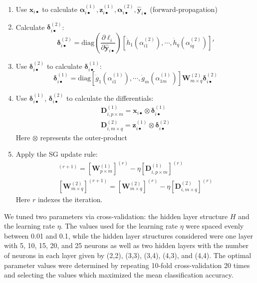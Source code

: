 \documentclass[a4paper]{article}
\newcommand{\diag}{\text{diag}}
\begin{document}
\begin{enumerate}
\item Use $\bm{x}_{i\bullet}$ to calculate $\bm{\alpha}_{i\bullet}^{(1)}, \bm{z}_{i\bullet}^{(1)}, \bm{\alpha}_{i\bullet}^{(2)}, \bm{\hat{y}}_{i\bullet}$ (forward-propagation)
\item Calculate $\bm{\delta}_{i\bullet}^{(2)}$:
\begin{equation*}
\bm{\delta}_{i\bullet}^{(2)} = \diag\left(\frac{\partial\ell_{i}}{\partial \bm{\hat{y}}_{i\bullet}}\right)[\dot{h}_{1}(\alpha_{i1}^{(2)}),\cdots,\dot{h}_{q}(\alpha_{iq}^{(2)})]'
\end{equation*}
\item Use $\bm{\delta}_{i\bullet}^{(2)}$ to calculate  $\bm{\delta}_{i\bullet}^{(1)}$:
\begin{equation*}
\bm{\delta}_{i\bullet}^{(1)} = \diag[\dot{g}_{1}(\alpha_{i1}^{(1)}),\cdots,\dot{g}_{m}(\alpha_{1m}^{(1)})]\bm{W}_{m\times q}^{(2)}\bm{\delta}_{i\bullet}^{(2)}
\end{equation*}
\item Use $\bm{\delta}_{i\bullet}^{(1)}$, $\bm{\delta}_{i\bullet}^{(2)}$ to calculate the differentials:
\begin{gather*}
\bm{D}_{i,p\times m}^{(1)} = \bm{x}_{i\bullet} \otimes \bm{\delta}_{i\bullet}^{(1)} \\
\bm{D}_{i,m\times q}^{(2)} = \bm{z}_{i\bullet}^{(1)} \otimes \bm{\delta}_{i\bullet}^{(2)}
\end{gather*}
Here $\otimes$ represents the outer-product
\item Apply the SG update rule:
\begin{gather*}
[\bm{W}_{p\times m}^{(1)}]^{(r+1)} = [\bm{W}_{p\times m}^{(1)}]^{(r)}-\eta[\bm{D}_{i,p \times m}^{(1)}]^{(r)} \\
[\bm{W}_{m\times q}^{(2)}]^{(r+1)} = [\bm{W}_{m\times q}^{(2)}]^{(r)}-\eta[\bm{D}_{i,m\times q}^{(2)}]^{(r)}
\end{gather*}
Here $r$ indexes the iteration. 
\end{enumerate}

We tuned two parameters via cross-validation: the hidden layer structure $H$ and the learning rate $\eta$. The values used for the learning rate $\eta$ were spaced evenly between 0.01 and 0.1, while the hidden layer structures considered were one layer with 5, 10, 15, 20, and 25 neurons as well as two hidden layers with the number of neurons in each layer given by (2,2), (3,3), (3,4), (4,3), and (4,4). The optimal parameter values were determined by repeating 10-fold cross-validation 20 times and selecting the values which maximized the mean classification accuracy. 
\end{document}
